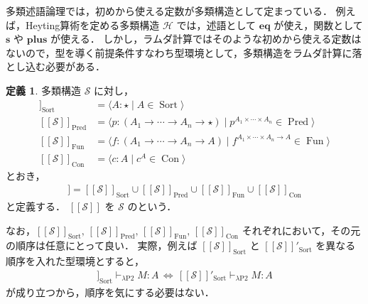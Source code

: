 \documentclass[./main]{subfiles}
\newcommand{\lam}{\lambda}
\newcommand{\bto}{\mathbin{\to}}
\newcommand{\ocl}{\mathord{:}}
\newcommand{\op}[1]{\mathop{\mathrm{#1}}\nolimits}
\newcommand{\comb}[1]{\mathbf{#1}}
\newcommand{\typstar}{\mathord{\star}}
\newcommand{\textem}[1]{\textbf{\textgt{#1}}}
\newcommand{\mathscr}[1]{\mathcal{#1}}
\newcommand{\fl}[1]{}
\newcommand{\ats}{\,}
\newcommand{\fLongleftrightarrow}{\,\Longleftrightarrow\,}
\newcommand{\llbracket}{[\![}
\newcommand{\rrbracket}{]\!]}
\theoremstyle{definition}
\newtheorem{defi}[theo]{定義}
\begin{document}
多類述語論理では，初めから使える定数が多類構造として定まっている．
例えば，Heyting算術を定める多類構造 $ \mathscr{H} $ では，述語として $ \comb{eq} $ が使え，関数として $ \comb{s} $ や $ \comb{plus} $ が使える．
しかし，ラムダ計算ではそのような初めから使える定数はないので，型を導く前提条件すなわち型環境として，多類構造をラムダ計算に落とし込む必要がある．

\begin{defi}
多類構造 $ \mathscr{S} $ に対し，
\begin{align*}
\llbracket \mathscr{S} \rrbracket _{\op{Sort}} & = \langle A \ocl\, \typstar \mid A \in \op{Sort} \rangle \\
\llbracket \mathscr{S} \rrbracket _{\op{Pred}} & = \langle p \ocl\, (A _1 \bto \cdots \bto A _n \bto \typstar) \mid p ^{A _1 \times \cdots \times A _n} \in \op{Pred} \rangle \\
\llbracket \mathscr{S} \rrbracket _{\op{Fun}} & = \langle f \ocl\, (A _1 \bto \cdots \bto A _n \bto A) \mid f ^{A _1 \times \cdots \times A _n \bto A} \in \op{Fun} \rangle \\
\llbracket \mathscr{S} \rrbracket _{\op{Con}} & = \langle c \ocl\, A \mid c ^A \in \op{Con} \rangle
\end{align*}
とおき，
\begin{gather*}
\llbracket \mathscr{S} \rrbracket = \llbracket \mathscr{S} \rrbracket _{\op{Sort}} \cup \llbracket \mathscr{S} \rrbracket _{\op{Pred}} \cup \llbracket \mathscr{S} \rrbracket _{\op{Fun}} \cup \llbracket \mathscr{S} \rrbracket _{\op{Con}}
\end{gather*}
と定義する．
$ \llbracket \mathscr{S} \rrbracket $ を $ \mathscr{S} $ の\textem{標準環境\fl{canonical context}}という．
\end{defi}

なお，$ \llbracket \mathscr{S} \rrbracket _{\op{Sort}},\ats \llbracket \mathscr{S} \rrbracket _{\op{Pred}},\ats \llbracket \mathscr{S} \rrbracket _{\op{Fun}},\ats \llbracket \mathscr{S} \rrbracket _{\op{Con}} $ それぞれにおいて，その元の順序は任意にとって良い．
実際，例えば $ \llbracket \mathscr{S} \rrbracket _{\op{Sort}} $ と $ \llbracket \mathscr{S} \rrbracket' _{\op{Sort}} $ を異なる順序を入れた型環境とすると，
\begin{gather*}
\llbracket \mathscr{S} \rrbracket _{\op{Sort}} \vdash _{\lam \mathrm{P2}} M \ocl\, A \fLongleftrightarrow \llbracket \mathscr{S} \rrbracket' _{\op{Sort}} \vdash _{\lam \mathrm{P2}} M \ocl\, A
\end{gather*}
が成り立つから，順序を気にする必要はない．
\end{document}
